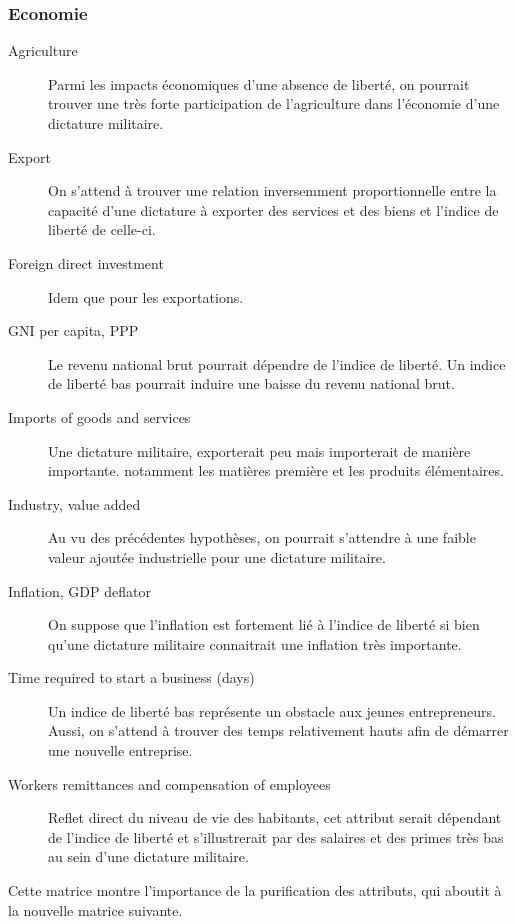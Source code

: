 \subsubsection{Economie}
\begin{description}
\item [Agriculture]
Parmi les impacts économiques d'une absence de liberté, on pourrait trouver une très forte participation de l'agriculture dans l'économie d'une dictature militaire.
\item [Export]
On s'attend à trouver une relation inversemment proportionnelle entre la capacité d'une dictature à exporter des services et des biens et l'indice de liberté de celle-ci.
\item [Foreign direct investment]
Idem que pour les exportations. 
\item [GNI per capita, PPP ]
Le revenu national brut pourrait dépendre de l'indice de liberté. Un indice de liberté bas pourrait induire une baisse du revenu national brut.
\item [Imports of goods and services] 
Une dictature militaire, exporterait peu mais importerait de manière importante. notamment les matières première et les produits élémentaires.
\item [Industry, value added]
Au vu des précédentes hypothèses, on pourrait s'attendre à une faible valeur ajoutée industrielle pour une dictature militaire. 
\item [Inflation, GDP deflator] 
On suppose que l'inflation est fortement lié à l'indice de liberté si bien qu'une dictature militaire connaitrait une inflation très importante.
\item [Time required to start a business (days)]
Un indice de liberté bas représente un obstacle aux jeunes entrepreneurs. Aussi, on s'attend à trouver des temps relativement hauts afin de démarrer une nouvelle entreprise. 
\item [Workers remittances and compensation of employees]
Reflet direct du niveau de vie des habitants, cet attribut serait dépendant de l'indice de liberté et s'illustrerait par des salaires et des primes très bas au sein d'une dictature militaire.
\end{description}

Cette matrice montre l'importance de la purification des attributs, qui aboutit à la nouvelle matrice suivante.

